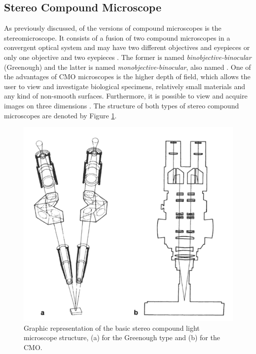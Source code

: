 \subsection{Stereo Compound Microscope}

As previously discussed, of the versions of compound microscopes is the stereomicroscope. It consists of a fusion of two compound microscopes in a convergent optical system and may have two different objectives and eyepieces or only one objective and two eyepieces \cite{schreier2004advances}. The former is named \emph{binobjective-binocular} (Greenough) and the latter is named \emph{monobjective-binocular}, also named . One of the advantages of CMO microscopes is the higher depth of field, which allows the user to view and investigate biological specimens, relatively small materials and any kind of non-smooth surfaces. Furthermore, it is possible to view and acquire images on three dimensions \cite{rochow1994introduction}. The structure of both types of stereo compound microscopes are denoted by Figure \ref{fig:stereo_compound_microscope}.

\begin{figure}[htb]
	\centering
	\caption{\label{fig:stereo_compound_microscope} Graphic representation of the basic stereo compound light microscope structure, (a) for the Greenough type and (b) for the CMO.}
	\begin{center}
	    \includegraphics[scale=0.4]{images/fig6.png}
	\end{center}
	\centering
\end{figure}